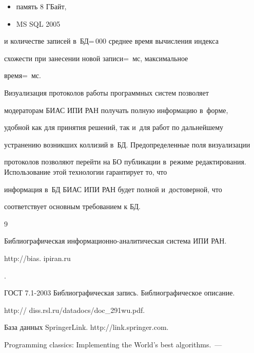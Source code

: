 {\begin{itemize}
\item память 8 ГБайт,


\item MS SQL 2005


\end{itemize}


и количестве записей в~БД\;=\,000 среднее время вычисления индекса


схожести при занесении новой записи\;=~мс, максимальное


время\;=~мс.





  Визуализация протоколов работы программных систем позволяет


модераторам БИАС ИПИ РАН получать полную информацию в~форме,


удобной как для принятия решений, так и~для работ по дальнейшему


устранению возникших коллизий в~БД. Предопределенные поля визуализации


протоколов позволяют перейти на БО пуб\-ли\-ка\-ции в~режиме редактирования. Использование этой технологии гарантирует то, что


информация в~БД БИАС ИПИ РАН будет полной и~достоверной, что


соответствует основным требованием к БД.





{\small\frenchspacing


{%




\begin{thebibliography}{9}




Библиографическая информационно-аналитическая система ИПИ РАН. {\sf


http://bias. ipiran.ru}.




ГОСТ 7.1-2003 Библиографическая запись. Библиографическое описание.


{\sf http:// diss.rsl.ru/datadocs/doc\_291wu.pdf}.




База данных SpringerLink. {http://link.springer.com}.




 Programming classics: Implementing the World's best algorithms.~---



\end{thebibliography}}}}
